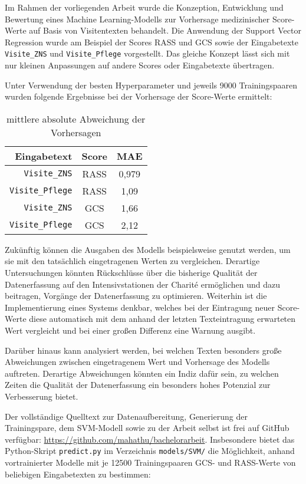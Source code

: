 Im Rahmen der vorliegenden Arbeit wurde die Konzeption, Entwicklung und Bewertung eines Machine Learning-Modells zur Vorhersage medizinischer Score-Werte auf Basis von Visitentexten behandelt. Die Anwendung der Support Vector Regression wurde am Beispiel der Scores RASS und GCS sowie der Eingabetexte \texttt{Visite\_ZNS} und \texttt{Visite\_Pflege} vorgestellt. Das gleiche Konzept lässt sich mit nur kleinen Anpassungen auf andere Scores oder Eingabetexte übertragen.

Unter Verwendung der besten Hyperparameter  und jeweils 9000 Trainingspaaren wurden folgende Ergebnisse bei der Vorhersage der Score-Werte ermittelt:

\begin{table}[h]
    \centering
    \begin{tabular}{rcc}
        Eingabetext
        & Score
        & MAE\\
        \midrule
        \texttt{Visite\_ZNS}    & RASS & 0,979 \\
        \texttt{Visite\_Pflege} & RASS & 1,09 \\
        \texttt{Visite\_ZNS}    & GCS  & 1,66 \\
        \texttt{Visite\_Pflege} & GCS  & 2,12 \\
        \bottomrule
    \end{tabular}
    \caption{mittlere absolute Abweichung der Vorhersagen}
\end{table}

Zukünftig können die Ausgaben des Modells beispielsweise genutzt werden, um sie mit den tatsächlich eingetragenen Werten zu vergleichen. Derartige Untersuchungen könnten Rückschlüsse über die bisherige Qualität der Datenerfassung auf den Intensivstationen der Charité ermöglichen und dazu beitragen, Vorgänge der Datenerfassung zu optimieren. Weiterhin ist die Implementierung eines Systems denkbar, welches bei der Eintragung neuer Score-Werte diese automatisch mit dem anhand der letzten Texteintragung erwarteten Wert vergleicht und bei einer großen Differenz eine Warnung ausgibt.

Darüber hinaus kann analysiert werden, bei welchen Texten besonders große Abweichungen zwischen eingetragenem Wert und Vorhersage des Modells auftreten. Derartige Abweichungen könnten ein Indiz dafür sein, zu welchen Zeiten die Qualität der Datenerfassung ein besonders hohes Potenzial zur Verbesserung bietet.

Der vollständige Quelltext zur Datenaufbereitung, Generierung der Trainingspare, dem SVM-Modell sowie zu der Arbeit selbst ist frei auf GitHub verfügbar: \url{https://github.com/mahathu/bachelorarbeit}. Insbesondere bietet das Python-Skript \texttt{predict.py} im Verzeichnis \texttt{models/SVM/} die Möglichkeit, anhand vortrainierter Modelle mit je 12500 Trainingspaaren GCS- und RASS-Werte von beliebigen Eingabetexten zu bestimmen:

